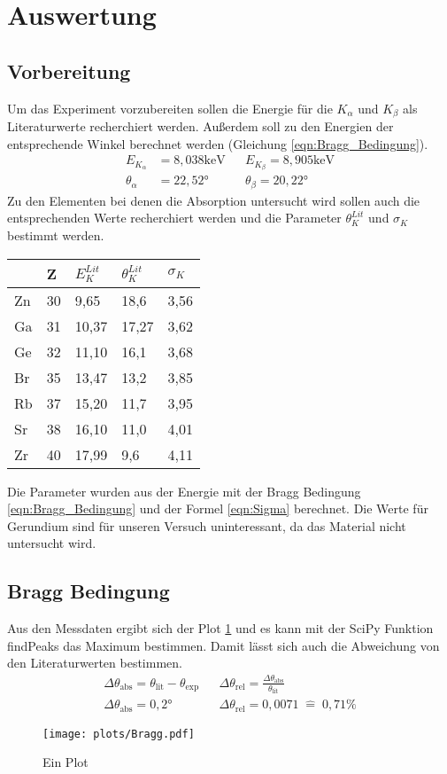 \section{Auswertung}
\label{sec:Auswertung}
\subsection{Vorbereitung}
Um das Experiment vorzubereiten sollen die Energie für die $K_{\alpha}$ und $K_{\beta}$ als Literaturwerte recherchiert werden.
Außerdem soll zu den Energien der entsprechende Winkel berechnet werden (Gleichung \ref{eqn:Bragg_Bedingung}).
\begin{align}
    E_{K_{\alpha}} &= 8,038 \text{keV} && E_{K_{\beta}} = 8,905 \text{keV} \nonumber \\
    \theta_{\alpha} &= 22,52°    &&      \theta_{\beta} = 20,22° \nonumber
\end{align}
Zu den Elementen bei denen die Absorption untersucht wird sollen auch die entsprechenden Werte recherchiert werden und die Parameter $\theta_K^{Lit}$ und $\sigma_K$ bestimmt werden.
\begin{table}[H]
\centering
\begin{tabular}{lllll}
  & Z & $E_K^{Lit}$ & $\theta_K^{Lit}$ & $\sigma_K$\\
  \toprule
Zn & 30 & 9,65 & 18,6 & 3,56\\
\midrule
Ga & 31 & 10,37 & 17,27 & 3,62\\
\midrule
Ge & 32 & 11,10 & 16,1 & 3,68\\ 
\midrule
Br & 35 & 13,47 & 13,2 & 3,85\\ 
\midrule
Rb & 37 & 15,20 & 11,7 & 3,95\\ 
\midrule
Sr & 38 & 16,10 & 11,0 & 4,01\\
\midrule
Zr & 40 & 17,99 & 9,6 & 4,11\\
\bottomrule
\end{tabular}
\end{table}
Die Parameter wurden aus der Energie mit der Bragg Bedingung \ref{eqn:Bragg_Bedingung} und der Formel \ref{eqn:Sigma} berechnet.
Die Werte für Gerundium sind für unseren Versuch uninteressant, da das Material nicht untersucht wird.
\subsection{Bragg Bedingung}
Aus den Messdaten ergibt sich der Plot \ref{fig:Bragg} und es kann mit der SciPy Funktion findPeaks das Maximum bestimmen.
Damit lässt sich auch die Abweichung von den Literaturwerten bestimmen.
\begin{align}
    \Delta \theta_{\text{abs}} = \theta_{\text{lit}}-\theta_{\text{exp}} && \Delta \theta_{\text{rel}} = \frac{\Delta \theta_{\text{abs}}}{\theta_{\text{lit}}}\\
    \Delta \theta_{\text{abs}} = 0,2° &&     \Delta \theta_{\text{rel}} = 0,0071 \; \hat{=} \; 0,71 \% 
\end{align}
\begin{figure}
    \centering
    \texttt{[image: plots/Bragg.pdf]}
    \caption{Ein Plot}
    \label{fig:Bragg}
\end{figure}

